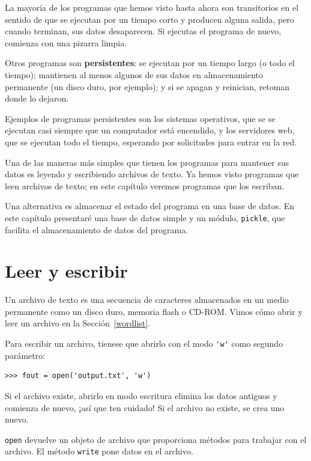 \documentclass[10pt]{book}
\begin{document}
La mayoría de los programas que hemos visto hasta ahora son transitorios en el
sentido de que se ejecutan por un tiempo corto y producen alguna salida,
pero cuando terminan, sus datos desaparecen.  Si ejecutas el programa
de nuevo, comienza con una pizarra limpia.

Otros programas son {\bf persistentes}: se ejecutan por un tiempo largo
(o todo el tiempo); mantienen al menos algunos de sus datos
en almacenamiento permanente (un disco duro, por ejemplo); y
si se apagan y reinician, retoman donde lo dejaron.

Ejemplos de programas persistentes son los sistemas operativos, que se
se ejecutan casi siempre que un computador está encendido, y los servidores web,
que se ejecutan todo el tiempo, esperando por solicitudes para entrar en
la red.

Una de las maneras más simples que tienen los programas para mantener sus datos 
es leyendo y escribiendo archivos de texto.  Ya hemos visto
programas que leen archivos de texto; en este capítulo veremos programas
que los escriban.

Una alternativa es almacenar el estado del programa en una base de datos.
En este capítulo presentaré una base de datos simple y un módulo,
{\tt pickle}, que facilita el almacenamiento de datos del programa.


\section{Leer y escribir}

Un archivo de texto es una secuencia de caracteres almacenados en un medio
permanente como un disco duro, memoria flash o CD-ROM.  Vimos cómo
abrir y leer un archivo en la Sección~\ref{wordlist}.

Para escribir un archivo, tienese que abrirlo con el modo \verb"'w'" como segundo
parámetro:

\begin{verbatim}
>>> fout = open('output.txt', 'w')
\end{verbatim}
%
Si el archivo existe, abrirlo en modo escritura elimina
los datos antiguos y comienza de nuevo, ¡así que ten cuidado!
Si el archivo no existe, se crea uno nuevo.

{\tt open} devuelve un objeto de archivo que proporciona métodos para trabajar
con el archivo.
El método {\tt write} pone datos en el archivo.
\end{document}
